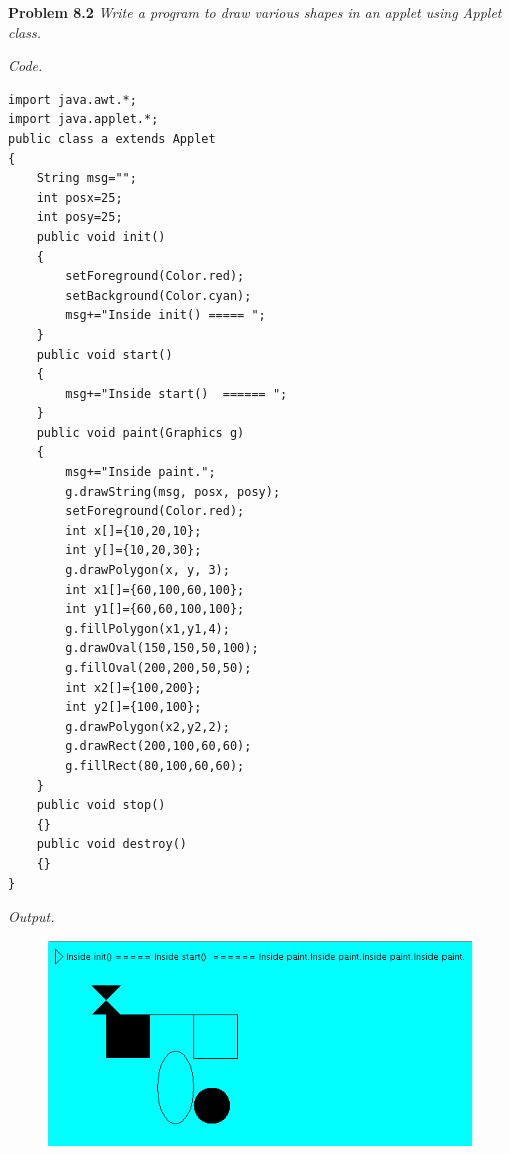 \documentclass[12pt]{article}
\begin{document}
\textbf{Problem 8.2} \textit{ Write a program to draw various shapes in an applet using Applet class.}

\textit{Code.}

\begin{lstlisting}
import java.awt.*;
import java.applet.*;
public class a extends Applet
{
	String msg="";
	int posx=25;
	int posy=25;
	public void init()
	{
		setForeground(Color.red);
		setBackground(Color.cyan);
		msg+="Inside init() ===== ";
	}
	public void start()
	{
		msg+="Inside start()  ====== ";
	}
	public void paint(Graphics g)
	{
		msg+="Inside paint.";
		g.drawString(msg, posx, posy);
		setForeground(Color.red);
		int x[]={10,20,10};
		int y[]={10,20,30};
		g.drawPolygon(x, y, 3);
		int x1[]={60,100,60,100};
		int y1[]={60,60,100,100};
		g.fillPolygon(x1,y1,4);
		g.drawOval(150,150,50,100);
		g.fillOval(200,200,50,50);
		int x2[]={100,200};
		int y2[]={100,100};
		g.drawPolygon(x2,y2,2);
		g.drawRect(200,100,60,60);
		g.fillRect(80,100,60,60);
	}
	public void stop()
	{}
	public void destroy()
	{}
}
\end{lstlisting}

\textit{Output.}

\begin{figure}[h!]
  \includegraphics[width=148mm]{img_applet_2.jpg}
  \label{fig:boat1}
\end{figure}



\end{document}
